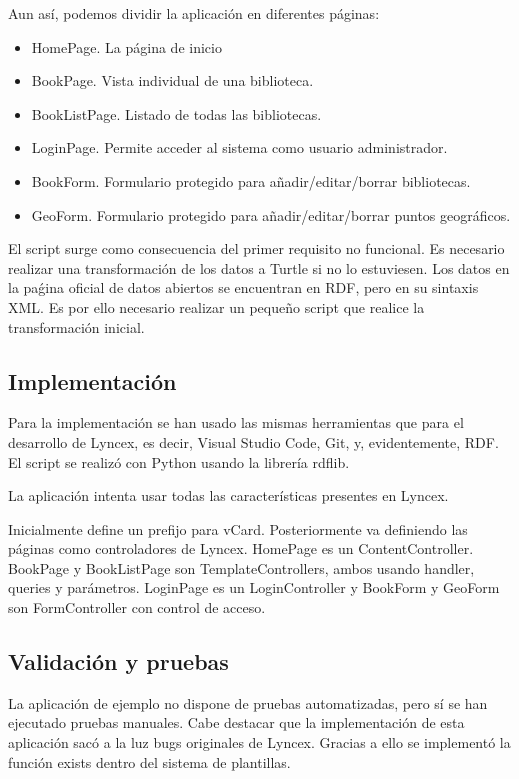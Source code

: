 \documentclass[12pt]{report} %
\begin{document}
Aun así, podemos dividir la aplicación en diferentes páginas:
\begin{itemize}
    \item HomePage. La página de inicio
    \item BookPage. Vista individual de una biblioteca.
    \item BookListPage. Listado de todas las bibliotecas.
    \item LoginPage. Permite acceder al sistema como usuario administrador.
    \item BookForm. Formulario protegido para añadir/editar/borrar bibliotecas.
    \item GeoForm. Formulario protegido para añadir/editar/borrar puntos geográficos.
\end{itemize}

El script surge como consecuencia del primer requisito no funcional. Es necesario realizar una transformación de los datos a Turtle si no lo estuviesen. Los datos en la paǵina oficial de datos abiertos se encuentran en RDF, pero en su sintaxis XML. Es por ello necesario realizar un pequeño script que realice la transformación inicial.


\subsection{Implementación}

Para la implementación se han usado las mismas herramientas que para el desarrollo de Lyncex, es decir, Visual Studio Code, Git, y, evidentemente, RDF. El script se realizó con Python usando la librería rdflib.

La aplicación intenta usar todas las características presentes en Lyncex. 

Inicialmente define un prefijo para vCard. Posteriormente va definiendo las páginas como controladores de Lyncex. HomePage es un ContentController. BookPage y BookListPage son TemplateControllers, ambos usando handler, queries y parámetros. LoginPage es un LoginController y BookForm y GeoForm son FormController con control de acceso.

\subsection{Validación y pruebas} 

La aplicación de ejemplo no dispone de pruebas automatizadas, pero sí se han ejecutado pruebas manuales. Cabe destacar que la implementación de esta aplicación sacó a la luz bugs originales de Lyncex. Gracias a ello se implementó la función exists dentro del sistema de plantillas.
\end{document}
